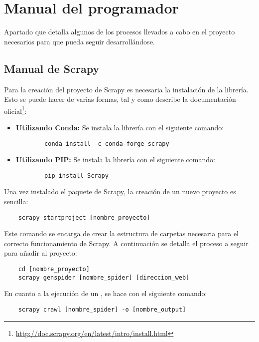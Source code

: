 \section{Manual del programador}

Apartado que detalla algunos de los procesos llevados a cabo en el proyecto necesarios para que pueda seguir desarrollándose.

\subsection{Manual de Scrapy}

Para la creación del proyecto de Scrapy es necesaria la instalación de la librería. Esto se puede hacer de varias formas, tal y como describe la documentación oficial\footnote{\url{http://doc.scrapy.org/en/latest/intro/install.html}}:

\begin{itemize}
    \item \textbf{Utilizando Conda:} Se instala la librería con el siguiente comando:
        \begin{verbatim}
        conda install -c conda-forge scrapy
        \end{verbatim}
    \item \textbf{Utilizando PIP:} Se instala la librería con el siguiente comando:
        \begin{verbatim}
        pip install Scrapy
        \end{verbatim}
\end{itemize}

Una vez instalado el paquete de Scrapy, la creación de un nuevo proyecto es sencilla:

\begin{verbatim}
    scrapy startproject [nombre_proyecto]
\end{verbatim}

Este comando se encarga de crear la estructura de carpetas necesaria para el correcto funcionamiento de Scrapy. A continuación se detalla el proceso a seguir para añadir  al proyecto:

\begin{verbatim}
    cd [nombre_proyecto]
    scrapy genspider [nombre_spider] [direccion_web]
\end{verbatim}

En cuanto a la ejecución de un , se hace con el siguiente comando:

\begin{verbatim}
    scrapy crawl [nombre_spider] -o [nombre_output]
\end{verbatim}

